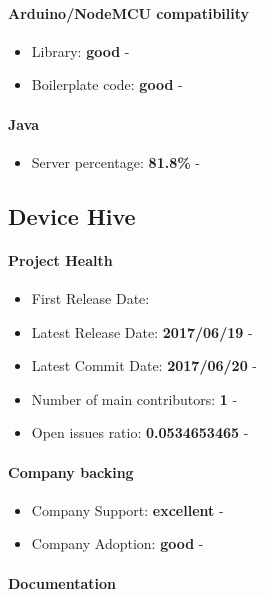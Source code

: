 \documentclass{article}
\begin{document}
\paragraph{Arduino/NodeMCU compatibility}

\begin{itemize}
\item Library: \textbf{good} - 
\item Boilerplate code: \textbf{good} - 
\end{itemize}

\paragraph{Java} 

\begin{itemize}
\item Server percentage: \textbf{81.8\%} - 
\end{itemize}

\subsection{Device Hive}

\paragraph{Project Health}

\begin{itemize}
\item First Release Date: 
\item Latest Release Date: \textbf{2017/06/19} - 
\item Latest Commit Date: \textbf{2017/06/20} - 
\item Number of main contributors: \textbf{1} - 
\item Open issues ratio: \textbf{0.0534653465} - 
\end{itemize}

\paragraph{Company backing}

\begin{itemize}
\item Company Support: \textbf{excellent} - 
\item Company Adoption: \textbf{good} - 
\end{itemize}

\paragraph{Documentation}
\end{document}
